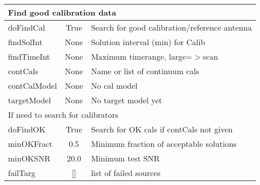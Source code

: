 \documentclass[11pt]{article}
\begin{document}
\begin{center}
\begin{tabular}{|l|c|l|}
\hline
\multicolumn{3}{|l|}{Find good calibration data} \\
\hline
doFindCal & True & Search for good calibration/reference antenna \\
findSolInt & None & Solution interval (min) for Calib \\
findTimeInt & None & Maximum timerange, large=$>$scan \\
contCals & None & Name or list of continuum cals \\
contCalModel & None & No cal model \\
targetModel & None & No target model yet \\

\hline
\multicolumn{3}{|l|}{If need to search for calibrators} \\
\hline
doFindOK & True & Search for OK cals if contCals not given \\
minOKFract & 0.5 & Minimum fraction of acceptable solutions \\
minOKSNR & 20.0 & Minimum test SNR \\
failTarg & [] & list of failed sources \\

\hline
\end{tabular}
\end{center}
\clearpage
\end{document}
